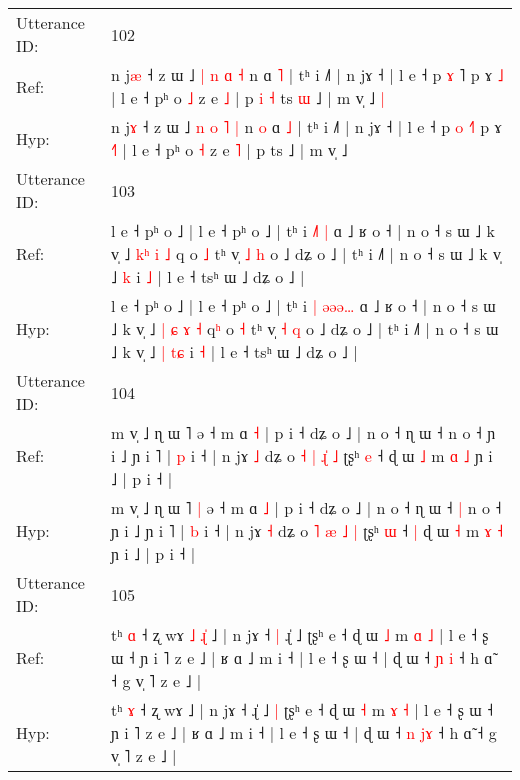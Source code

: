 \documentclass[10pt]{article}
\DeclareRobustCommand{\hl}[1]{{\textcolor{red}{#1}}}
\begin{document}
\begin{longtable}{ll}
 \\
\midrule
Utterance ID: & 102 \\
Ref: & n j\hl{æ} ˧ z ɯ ˩ \hl{|} \hl{n} \hl{ɑ} \hl{˧} n\hl{}\hl{} ɑ \hl{˥} | tʰ i ˩˥ | n jɤ ˧ | l e ˧ p \hl{ɤ} \hl{}˥ p ɤ \hl{}\hl{˩} | l e ˧ pʰ o \hl{˩} z e \hl{˩} | p\hl{ }\hl{i}\hl{ }\hl{˧} ts\hl{ }\hl{ɯ} ˩ | m v̩ ˩\hl{ }\hl{|}
 \\
Hyp: & n j\hl{ɤ} ˧ z ɯ ˩ \hl{n} \hl{o} \hl{˥} \hl{|} n\hl{ }\hl{o} ɑ \hl{˩} | tʰ i ˩˥ | n jɤ ˧ | l e ˧ p \hl{o} \hl{˧}˥ p ɤ \hl{˧}\hl{˥} | l e ˧ pʰ o \hl{˧} z e \hl{˥} | p\hl{}\hl{}\hl{}\hl{} ts\hl{}\hl{} ˩ | m v̩ ˩\hl{}\hl{}
 \\
\midrule
Utterance ID: & 103 \\
Ref: & l e ˧ pʰ o ˩ | l e ˧ pʰ o ˩ | tʰ i\hl{}\hl{} \hl{˩}\hl{˥}\hl{ }\hl{|} ɑ ˩ ʁ o ˧ | n o ˧ s ɯ ˩ k v̩ ˩ \hl{}\hl{k}\hl{ʰ} \hl{i} \hl{˩} q\hl{} o \hl{˩} tʰ v̩ \hl{˩} \hl{h} o ˩ dʑ o ˩ | tʰ i ˩˥ | n o ˧ s ɯ ˩ k v̩ ˩\hl{}\hl{} \hl{}\hl{k} i \hl{˩} | l e ˧ tsʰ ɯ ˩ dʑ o ˩ |
 \\
Hyp: & l e ˧ pʰ o ˩ | l e ˧ pʰ o ˩ | tʰ i\hl{ }\hl{|} \hl{ə}\hl{ə}\hl{ə}\hl{…} ɑ ˩ ʁ o ˧ | n o ˧ s ɯ ˩ k v̩ ˩ \hl{|}\hl{ }\hl{ɕ} \hl{ɤ} \hl{˧} q\hl{ʰ} o \hl{˧} tʰ v̩ \hl{˧} \hl{q} o ˩ dʑ o ˩ | tʰ i ˩˥ | n o ˧ s ɯ ˩ k v̩ ˩\hl{ }\hl{|} \hl{t}\hl{ɕ} i \hl{˧} | l e ˧ tsʰ ɯ ˩ dʑ o ˩ |
 \\
\midrule
Utterance ID: & 104 \\
Ref: & m v̩ ˩ ɳ ɯ ˥\hl{}\hl{} ə ˧ m ɑ \hl{˧} | p i ˧ dʑ o ˩ | n o ˧ ɳ ɯ ˧\hl{}\hl{} n o ˧ ɲ i ˩ ɲ i ˥ | \hl{p} i ˧ | n jɤ \hl{˩} dʑ o \hl{˧} \hl{|} \hl{ɻ}\hl{̍} \hl{˩} ʈʂʰ \hl{e} ˧\hl{}\hl{} ɖ ɯ \hl{˩} m \hl{ɑ} \hl{˩} ɲ i ˩ | p i ˧ |
 \\
Hyp: & m v̩ ˩ ɳ ɯ ˥\hl{ }\hl{|} ə ˧ m ɑ \hl{˩} | p i ˧ dʑ o ˩ | n o ˧ ɳ ɯ ˧\hl{ }\hl{|} n o ˧ ɲ i ˩ ɲ i ˥ | \hl{b} i ˧ | n jɤ \hl{˧} dʑ o \hl{˥} \hl{æ} \hl{}\hl{˩} \hl{|} ʈʂʰ \hl{ɯ} ˧\hl{ }\hl{|} ɖ ɯ \hl{˧} m \hl{ɤ} \hl{˧} ɲ i ˩ | p i ˧ |
 \\
\midrule
Utterance ID: & 105 \\
Ref: & tʰ \hl{ɑ} ˧ ʐ wɤ\hl{ }\hl{˩}\hl{ }\hl{ɻ}\hl{̍} ˩ | n jɤ ˧\hl{ }\hl{|} ɻ̍ ˩\hl{}\hl{} ʈʂʰ e ˧ ɖ ɯ \hl{˩} m \hl{ɑ} \hl{˩} | l e ˧ ʂ ɯ ˧ ɲ i ˥ z e ˩ | ʁ ɑ ˩ m i ˧ | l e ˧ ʂ ɯ ˧ | ɖ ɯ ˧ \hl{ɲ} \hl{}\hl{i} ˧ h ɑ̃ ˧ g v̩ ˥ z e ˩ |
 \\
Hyp: & tʰ \hl{ɤ} ˧ ʐ wɤ\hl{}\hl{}\hl{}\hl{}\hl{} ˩ | n jɤ ˧\hl{}\hl{} ɻ̍ ˩\hl{ }\hl{|} ʈʂʰ e ˧ ɖ ɯ \hl{˧} m \hl{ɤ} \hl{˧} | l e ˧ ʂ ɯ ˧ ɲ i ˥ z e ˩ | ʁ ɑ ˩ m i ˧ | l e ˧ ʂ ɯ ˧ | ɖ ɯ ˧ \hl{n} \hl{j}\hl{ɤ} ˧ h ɑ̃ ˧ g v̩ ˥ z e ˩ |
 \\

\end{longtable}
\end{document}
